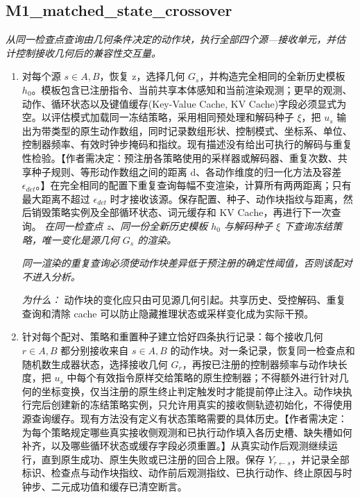 \documentclass[10pt,a4paper]{article}
\begin{document}
\subsection*{M1\_matched\_state\_crossover}
\emph{从同一检查点查询由几何条件决定的动作块，执行全部四个源---接收单元，并估计控制接收几何后的兼容性交互量。}
\begin{enumerate}[leftmargin=*,start=4]
  \item 对每个源 \(s\in {A,B}\)，恢复 z，选择几何 \(G_{s}\)，并构造完全相同的全新历史模板 \(h_{0}\)。模板包含已注册指令、当前共享本体感知和当前渲染观测；更早的观测、动作、循环状态以及键值缓存(Key-Value Cache, KV Cache)字段必须显式为空。以评估模式加载同一冻结策略，采用相同预处理和解码种子 \(\xi \)，把 \(u_{s}\) 输出为带类型的原生动作数组，同时记录数组形状、控制模式、坐标系、单位、控制器频率、有效时钟步掩码和指纹。现有描述没有给出可执行的解码与重复性检验。【作者需决定：预注册各策略使用的采样器或解码器、重复次数、共享种子规则、等形动作数组之间的距离 d、各动作维度的归一化方法及容差 \(\epsilon _{det}\)。】在完全相同的配置下重复查询每幅不变渲染，计算所有两两距离；只有最大距离不超过 \(\epsilon _{det}\) 时才接收该源。保存配置、种子、动作块指纹与距离，然后销毁策略实例及全部循环状态、词元缓存和 KV Cache，再进行下一次查询。
\noindent\emph{在同一检查点 z、同一份全新历史模板 \(h_{0}\) 与解码种子 \(\xi \) 下查询冻结策略，唯一变化是源几何 \(G_{s}\) 的渲染。}
\par{}
\noindent\emph{同一渲染的重复查询必须使动作块差异低于预注册的确定性阈值，否则该配对不进入分析。}
\par{}
\par\emph{为什么：} 动作块的变化应只由可见源几何引起。共享历史、受控解码、重复查询和清除 cache 可以防止隐藏推理状态或采样变化成为实际干预。
  \item 针对每个配对、策略和重置种子建立恰好四条执行记录：每个接收几何 \(r\in {A,B}\) 都分别接收来自 \(s\in {A,B}\) 的动作块。对一条记录，恢复同一检查点和随机数生成器状态，选择接收几何 \(G_{r}\)，再按已注册的控制器频率与动作块长度，把 \(u_{s}\) 中每个有效指令原样交给策略的原生控制器；不得额外进行针对几何的坐标变换，仅当注册的原生终止判定触发时才能提前停止注入。动作块执行完后创建新的冻结策略实例，只允许用真实的接收侧轨迹初始化，不得使用源查询缓存。现有方法没有定义有状态策略需要的具体历史。【作者需决定：为每个策略规定哪些真实接收侧观测和已执行动作填入各历史槽、缺失槽如何补齐，以及哪些循环状态或缓存字段必须重置。】从真实动作后观测继续运行，直到原生成功、原生失败或已注册的回合上限。保存 \(Y_{r\leftarrow s}\)，并记录全部标识、检查点与动作块指纹、动作前后观测指纹、已执行动作、终止原因与时钟步、二元成功值和缓存已清空断言。

\end{enumerate}
\end{document}
